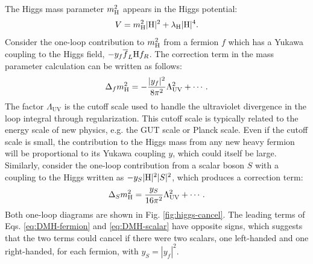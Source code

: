 \documentclass[12pt]{thesis}  %
\begin{document}
The Higgs mass parameter $m_{\mathrm{H}}^{2}$ appears in the Higgs potential:
\begin{equation}
V = m_{\mathrm{H}}^{2}|\mathrm{H}|^{2} + \lambda_{\mathrm{H}}|\mathrm{H}|^{4}.
\end{equation}
Consider the one-loop contribution to $m_{\mathrm{H}}^{2}$ from a fermion $f$ which has a Yukawa coupling to the Higgs field, $-y_{f} \overline{f}_{L} \mathrm{H} f_{R}$. The correction term in the mass parameter calculation can be written as follows:
\begin{equation}
\Delta_{f} m_{\mathrm{H}}^{2} = -\frac{|y_{f}|^{2}}{8\pi^{2}}\Lambda_{\text{UV}}^{2} + \cdots. \label{eq:DMH-fermion}
\end{equation}
The factor $\Lambda_{\text{UV}}$ is the cutoff scale used to handle the ultraviolet divergence in the loop integral through regularization. This cutoff scale is typically related to the energy scale of new physics, e.g. the GUT scale or Planck scale. Even if the cutoff scale is small, the contribution to the Higgs mass from any new heavy fermion will be proportional to its Yukawa coupling $y$, which could itself be large. Similarly, consider the one-loop contribution from a scalar boson $S$ with a coupling to the Higgs written as $-y_{S} |\mathrm{H}|^{2} |S|^{2}$, which produces a correction term:
\begin{equation}
\Delta_{S} m_{\mathrm{H}}^{2} = \frac{y_{S}}{16\pi^{2}}\Lambda_{\text{UV}}^{2} + \cdots. \label{eq:DMH-scalar}
\end{equation}
Both one-loop diagrams are shown in Fig. \ref{fig:higgs-cancel}. The leading terms of Eqs. \eqref{eq:DMH-fermion} and \eqref{eq:DMH-scalar} have opposite signs, which suggests that the two terms could cancel if there were two scalars, one left-handed and one right-handed, for each fermion, with $y_{S} = |y_{f}|^2$.
\end{document}
